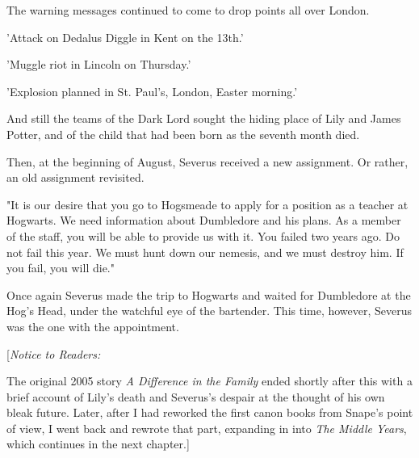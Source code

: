 \documentclass[a4paper,11pt]{article}
\begin{document}
The warning messages continued to come to drop points all over London.

'Attack on Dedalus Diggle in Kent on the 13th.'

'Muggle riot in Lincoln on Thursday.'

'Explosion planned in St. Paul's, London, Easter morning.'

And still the teams of the Dark Lord sought the hiding place of Lily and James Potter, and of the child that had been born as the seventh month died.

Then, at the beginning of August, Severus received a new assignment. Or rather, an old assignment revisited.

"It is our desire that you go to Hogsmeade to apply for a position as a teacher at Hogwarts. We need information about Dumbledore and his plans. As a member of the staff, you will be able to provide us with it. You failed two years ago. Do not fail this year. We must hunt down our nemesis, and we must destroy him. If you fail, you will die."

Once again Severus made the trip to Hogwarts and waited for Dumbledore at the Hog's Head, under the watchful eye of the bartender. This time, however, Severus was the one with the appointment.

[\emph{Notice to Readers:}

The original 2005 story \emph{A Difference in the Family }ended shortly after this with a brief account of Lily's death and Severus's despair at the thought of his own bleak future. Later, after I had reworked the first canon books from Snape's point of view, I went back and rewrote that part, expanding in into \emph{The Middle Years}, which continues in the next chapter.]
\end{document}

